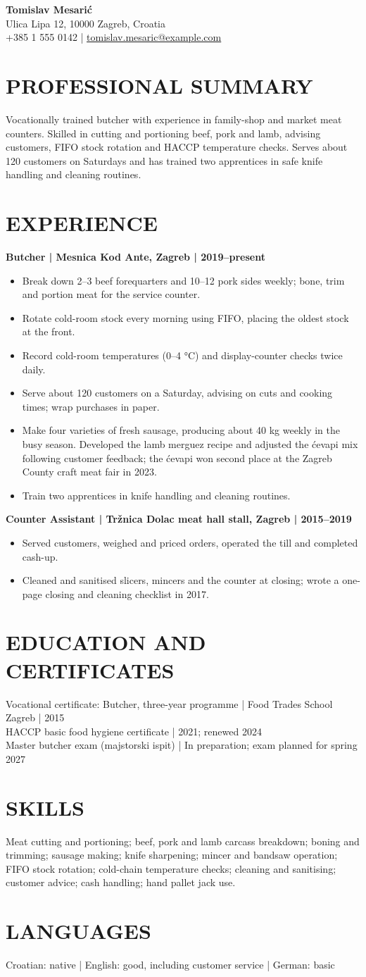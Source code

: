 \documentclass[11pt,a4paper]{article}
\newcommand{\cvsection}[1]{\section*{#1}}
\begin{document}
{\LARGE\bfseries\color{primarycolor} Tomislav Mesarić}\\[0.3em]
Ulica Lipa 12, 10000 Zagreb, Croatia\\
+385 1 555 0142 | \href{mailto:tomislav.mesaric@example.com}{tomislav.mesaric@example.com}

\cvsection{PROFESSIONAL SUMMARY}
Vocationally trained butcher with experience in family-shop and market meat counters. Skilled in cutting and portioning beef, pork and lamb, advising customers, FIFO stock rotation and HACCP temperature checks. Serves about 120 customers on Saturdays and has trained two apprentices in safe knife handling and cleaning routines.

\cvsection{EXPERIENCE}
\textbf{Butcher | Mesnica Kod Ante, Zagreb | 2019–present}
\begin{itemize}
\item Break down 2–3 beef forequarters and 10–12 pork sides weekly; bone, trim and portion meat for the service counter.
\item Rotate cold-room stock every morning using FIFO, placing the oldest stock at the front.
\item Record cold-room temperatures (0–4 °C) and display-counter checks twice daily.
\item Serve about 120 customers on a Saturday, advising on cuts and cooking times; wrap purchases in paper.
\item Make four varieties of fresh sausage, producing about 40 kg weekly in the busy season. Developed the lamb merguez recipe and adjusted the ćevapi mix following customer feedback; the ćevapi won second place at the Zagreb County craft meat fair in 2023.
\item Train two apprentices in knife handling and cleaning routines.
\end{itemize}
\textbf{Counter Assistant | Tržnica Dolac meat hall stall, Zagreb | 2015–2019}
\begin{itemize}
\item Served customers, weighed and priced orders, operated the till and completed cash-up.
\item Cleaned and sanitised slicers, mincers and the counter at closing; wrote a one-page closing and cleaning checklist in 2017.
\end{itemize}

\cvsection{EDUCATION AND CERTIFICATES}
Vocational certificate: Butcher, three-year programme | Food Trades School Zagreb | 2015\\
HACCP basic food hygiene certificate | 2021; renewed 2024\\
Master butcher exam (majstorski ispit) | In preparation; exam planned for spring 2027

\cvsection{SKILLS}
Meat cutting and portioning; beef, pork and lamb carcass breakdown; boning and trimming; sausage making; knife sharpening; mincer and bandsaw operation; FIFO stock rotation; cold-chain temperature checks; cleaning and sanitising; customer advice; cash handling; hand pallet jack use.

\cvsection{LANGUAGES}
Croatian: native | English: good, including customer service | German: basic
\end{document}

